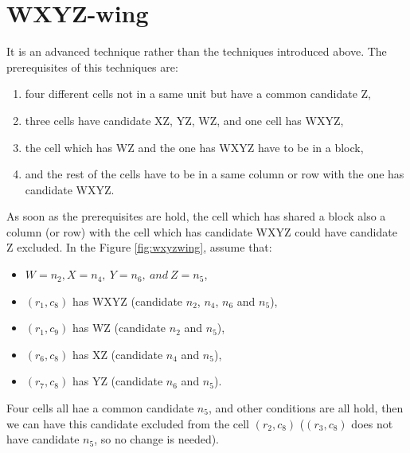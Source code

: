 \documentclass[11pt]{report}
\begin{document}
\section{WXYZ-wing}
\label{sec:WXYZ-wing}
It is an advanced technique rather than the techniques introduced above. The prerequisites of this techniques are:
\begin{enumerate}
\item four different cells not in a same unit but have a common candidate Z,
\item three cells have candidate XZ, YZ, WZ, and one cell has WXYZ,
\item the cell which has WZ and the one has WXYZ have to be in a block,
\item and the rest of the cells have to be in a same column or row with the one has candidate WXYZ.
\end{enumerate}
As soon as the prerequisites are hold, the cell which has shared a block also a column (or row) with the cell which has candidate WXYZ could have candidate Z excluded.
In the Figure \ref{fig:wxyzwing}, assume that:
\begin{itemize}
\item $W= n_{2}, X = n_{4},\ Y = n_{6},\ and\ Z = n_{5}$,
\item $(r_{1}, c_{8})$ has WXYZ (candidate $n_{2}$, $n_{4}$, $n_{6}$ and $n_{5}$),
\item $(r_{1}, c_{9})$ has WZ (candidate $n_{2}$ and $n_{5}$),
\item $(r_{6}, c_{8})$ has XZ (candidate $n_{4}$ and $n_{5}$),
\item $(r_{7}, c_{8})$ has YZ (candidate $n_{6}$ and $n_{5}$).
\end{itemize}
Four cells all hae a common candidate $n_{5}$, and other conditions are all hold, then we can have this candidate excluded from the cell $(r_{2}, c_{8})$ ($(r_{3}, c_{8})$ does not have candidate $n_{5}$, so no change is needed).
\end{document}

